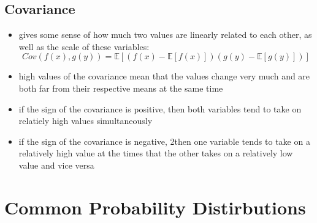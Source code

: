 \documentclass[11pt, twocolumn]{report}
\def\expectation{\mathbb{E}}
\begin{document}
\subsection{Covariance}
\begin{itemize}
  \item gives some sense of how much two values are linearly related to each
    other, as well as the scale of these variables:
    \begin{equation}
      Cov(f(x),g(y)) = \expectation{[(f(x) - \expectation{[f(x)]})(g(y) -
        \expectation{[g(y)]})]}
    \end{equation}
  \item high values of the covariance mean that the values change very much and
    are both far from their respective means at the same time
  \item if the sign of the covariance is positive, then both variables tend to
    take on relatiely high values simultaneously
  \item if the sign of the covariance is negative, 2then one variable tends to
    take on a relatively high value at the times that the other takes on a
    relatively low value and vice versa
\end{itemize}

\section{Common Probability Distirbutions}
\end{document}

